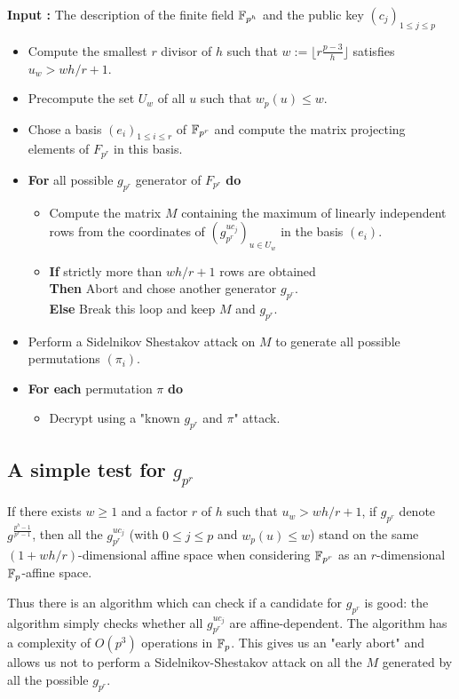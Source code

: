 \documentclass[a4paper]{article}
\newcommand{\GF}[1]{\F_{#1}}
\begin{document}
\textbf{Input : } The description of the finite field $\mathbb{F}_{p^h}$ and the public key $(c_j)_{1 \leq j \leq p}$
\begin{itemize}
\item Compute the smallest $r$ divisor of $h$ such that $w := \lfloor r \frac{p-3}{h} \rfloor$ satisfies $u_w > wh/r+1$.

\item Precompute the set $U_w$ of all $u$ such that $w_p(u) \leq w$.
\item Chose a basis $(e_i)_{1 \leq i \leq r}$ of $\mathbb{F}_{p^r}$ and compute the matrix projecting elements of $F_{p^r}$ in this basis.

\item \textbf{For} all possible $g_{p^r}$ generator of $F_{p^r}$ \textbf{do}
\begin{itemize}
\item Compute the matrix $M$ containing the maximum of linearly independent rows from the coordinates of $\left( g_{p^r}^{uc_j} \right)_{u \in U_w}$ in the basis $(e_i)$.

\item \textbf{If } strictly more than $wh/r+1$ rows are obtained\\
\textbf{Then } Abort and chose another generator $g_{p^r}$. \\
\textbf{Else } Break this loop and keep $M$ and $g_{p^r}$.
\end{itemize}
\item Perform a Sidelnikov Shestakov attack on $M$ to generate all possible permutations $(\pi_i)$.
\item \textbf{For each } permutation $\pi$ \textbf{ do }
\begin{itemize}
\item Decrypt using a "known $g_{p^r}$ and $\pi$" attack.
\end{itemize}
\end{itemize}



\subsection{A simple test for $g_{p^r}$}

\begin{theorem}
If there exists $w \geq 1$ and a factor $r$ of $h$ such that $u_w > wh/r + 1$, if $g_{p^r}$ denote $g^{\frac{p^h-1}{p^r-1}}$, then all the $g_{p^r}^{uc_j}$ (with $0 \leq j\leq p$ and $w_p(u) \leq w$) stand on the same $(1+wh/r)$-dimensional affine space when considering $\GF{p^r}$ as an $r$-dimensional $\GF{p}$-affine space.
\end{theorem}
Thus there is an algorithm which can check if a candidate for $g_{p^r}$ is good: the algorithm simply checks whether all $g_{p^r}^{uc_j}$ are affine-dependent. The algorithm has a complexity of $O(p^3)$ operations in $\GF{p}$.
This gives us an "early abort" and allows us not to perform a Sidelnikov-Shestakov attack on all the $M$ generated by all the possible $g_{p^r}$.
\end{document}
